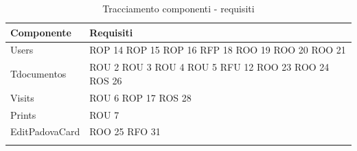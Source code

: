 \begin{center}
\def\arraystretch{2}
\begin{longtable}{|p{7cm}|p{3cm}|}
\cellcolor[gray]{0.9} \textbf{Componente} & \cellcolor[gray]{0.9} \textbf{Requisiti} \\ \hline
Users & ROP 14 \newline ROP 15 \newline ROP 16 \newline RFP 18 \newline ROO 19 \newline ROO 20 \newline ROO 21 \\ \hline
Tdocumentos & ROU 2 \newline ROU 3 \newline ROU 4 \newline ROU 5 \newline RFU 12 \newline ROO 23 \newline ROO 24 \newline ROS 26 \\ \hline
Visits & ROU 6 \newline ROP 17 \newline ROS 28 \\ \hline
Prints & ROU 7 \\ \hline
EditPadovaCard & ROO 25 \newline RFO 31 \\ \hline
\caption{Tracciamento componenti - requisiti}
\end{longtable}


\end{center}
